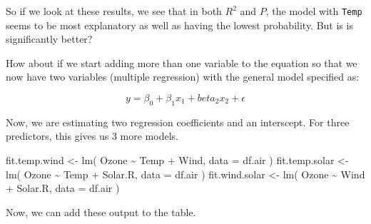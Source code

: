 \documentclass[
  letterpaper,
]{book}
\newenvironment{Shaded}{\begin{snugshade}}{\end{snugshade}}
\newcommand{\AttributeTok}[1]{\textcolor[rgb]{0.40,0.45,0.13}{#1}}
\newcommand{\FunctionTok}[1]{\textcolor[rgb]{0.28,0.35,0.67}{#1}}
\newcommand{\NormalTok}[1]{\textcolor[rgb]{0.00,0.23,0.31}{#1}}
\newcommand{\OtherTok}[1]{\textcolor[rgb]{0.00,0.23,0.31}{#1}}
\newcommand{\SpecialCharTok}[1]{\textcolor[rgb]{0.37,0.37,0.37}{#1}}
\begin{document}
So if we look at these results, we see that in both \(R^2\) and \(P\),
the model with \texttt{Temp} seems to be most explanatory as well as
having the lowest probability. But is is significantly better?

How about if we start adding more than one variable to the equation so
that we now have two variables (multiple regression) with the general
model specified as:

\[
y = \beta_0 + \beta_1 x_1 + beta_2 x_2 + \epsilon
\]

Now, we are estimating two regression coefficients and an interscept.
For three predictors, this gives us 3 more models.

\begin{Shaded}
\begin{Highlighting}[]
\NormalTok{fit.temp.wind }\OtherTok{\textless{}{-}} \FunctionTok{lm}\NormalTok{( Ozone }\SpecialCharTok{\textasciitilde{}}\NormalTok{ Temp }\SpecialCharTok{+}\NormalTok{ Wind, }\AttributeTok{data =}\NormalTok{ df.air )}
\NormalTok{fit.temp.solar }\OtherTok{\textless{}{-}} \FunctionTok{lm}\NormalTok{( Ozone }\SpecialCharTok{\textasciitilde{}}\NormalTok{ Temp }\SpecialCharTok{+}\NormalTok{ Solar.R, }\AttributeTok{data =}\NormalTok{ df.air )}
\NormalTok{fit.wind.solar }\OtherTok{\textless{}{-}} \FunctionTok{lm}\NormalTok{( Ozone }\SpecialCharTok{\textasciitilde{}}\NormalTok{ Wind }\SpecialCharTok{+}\NormalTok{ Solar.R, }\AttributeTok{data =}\NormalTok{ df.air )}
\end{Highlighting}
\end{Shaded}

Now, we can add these output to the table.
\end{document}
